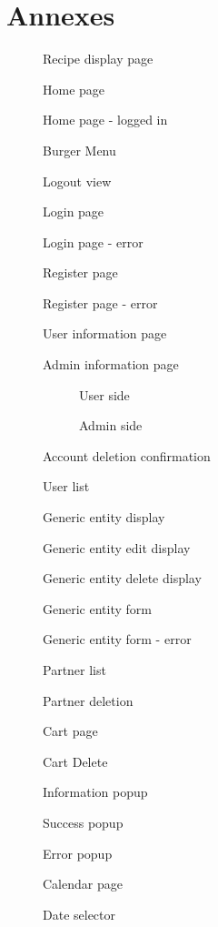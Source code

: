 \documentclass[english,12pt,twoside,a4paper]{report}
\newcommand{\image}[4]{
  \begin{figure}[ht]
    \centering
    \fbox{\texttt{[image: \#1]}}
    \caption{#3}
    \label{fig:#4}
  \end{figure}
}
\begin{document}
\chapter{Annexes}
\image{mockups/recipeViewAndComment}{0.65}{Recipe display page}{recipeViewAndComment}
\vfill
\image{mockups/homePage}{0.7}{Home page}{homePage}
\vfill
\image{mockups/homePageLoggedIn}{0.7}{Home page - logged in}{homePage}
\vfill
\image{mockups/burgerMenu}{0.75}{Burger Menu}{burgerMenu}
\vfill
\image{mockups/logout}{0.75}{Logout view}{lougout}
\vfill
\image{mockups/loginPage}{0.75}{Login page}{loginPage}
\vfill
\image{mockups/loginError}{0.75}{Login page - error}{loginPageError}
\vfill
\image{mockups/registerPage}{0.75}{Register page}{registerPage}
\vfill
\image{mockups/registerPageError}{0.75}{Register page - error}{regsiterPageError}
\vfill
\image{mockups/userInformation}{0.75}{User information page}{userInformation}
\vfill
\image{mockups/adminInformation}{0.75}{Admin information page}{adminInformation}
\vfill
\begin{figure}[h]
  \begin{subfigure}{0.45\linewidth}
    \caption{User side}
  \end{subfigure}
  \hfill
  \begin{subfigure}{0.45\linewidth}
    \caption{Admin side}
  \end{subfigure}
  \caption{Account deletion confirmation}
  \label{fig:acountDeletionConfirmation}
\end{figure}
\vfill
\image{mockups/userList}{0.75}{User list}{userList}
\vfill
\image{mockups/genericEntityDisplay}{0.75}{Generic entity display}{genericEntityDisplay}
\vfill
\image{mockups/genericEntityEditDisplay}{0.75}{Generic entity edit display}{genericEntityEditDisplay}
\vfill
\image{mockups/genericEntityDeleteDisplay}{0.75}{Generic entity delete display}{genericEntityDeleteDisplay}
\vfill
\image{mockups/genericForm}{0.6}{Generic entity form}{genericForm}
\vfill
\image{mockups/genericFormError}{0.6}{Generic entity form - error}{genericFormError}
\vfill
\image{mockups/partnerList}{0.75}{Partner list}{partnerList}
\vfill
\image{mockups/partnerDelete}{0.75}{Partner deletion}{partnerDelete}
\vfill
\image{mockups/cart}{0.75}{Cart page}{cartPage}
\vfill
\image{mockups/cartDelete}{0.75}{Cart Delete}{cartDelete}
\vfill
\image{mockups/infoPopup}{0.75}{Information popup}{infoPopup}
\vfill
\image{mockups/successPopup}{0.75}{Success popup}{successPopup}
\vfill
\image{mockups/errorPopup}{0.75}{Error popup}{errorPopup}
\vfill
\image{mockups/calendarView}{0.75}{Calendar page}{calendarPage}
\vfill
\image{mockups/dateSelector}{0.75}{Date selector}{dateSelector}
\vfill


\end{document}
